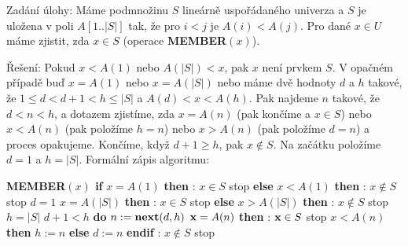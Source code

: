 \documentclass[a4paper,12pt]{article}
\begin{document}
Zadání úlohy: Máme podmnožinu $S$ lineárně 
uspořádaného univerza a $S$ je uložena v poli 
$A[1..|S|]$ tak, že pro $i<j$ je $A(i)<A(j)$. Pro dané $x\in 
U$ 
máme zjistit, zda $x\in S$ (operace {\bf MEMBER$(x)$}).

Řešení:  Pokud $x<A(1)$ nebo $A(|S|)<x$, pak $
x$ 
není prvkem $S$.  V opačném případě buď $x=
A(1)$ nebo 
$x=A(|S|)$ nebo máme dvě hodnoty $d$ 
a $h$ takové, že $1\le d<d+1<h\le |S|$ a $A(d)<x<A(h)$.  Pak 
najdeme $n$ takové, že $d<n<h$, a dotazem 
zjistíme, zda $x=A(n)$ (pak končíme a $x\in S$) nebo 
$x<A(n)$ (pak položíme $h=n$) nebo $x>A(n)$ (pak 
položíme $d=n$) a proces opakujeme.  Končíme, když 
$d+1\ge h$, pak $x\notin S$. Na začátku položíme $d=1$ a $
h=|S|$.
Formální zápis algoritmu:

{\bf MEMBER$(x)$\newline 
if} $x=A(1)$ {\bf then}\newline 
\phantom{---}{\bf Výstup}: $x\in S$ stop\newline 
{\bf else}\newline 
\phantom{---}{\bf if} $x<A(1)$ {\bf then}\newline 
\phantom{------}{\bf Výstup}: $x\notin S$ stop\newline 
\phantom{---}{\bf else}\newline 
\phantom{------}$d=1$\newline 
\phantom{---}{\bf endif\newline
\bf endif\newline 
if} $x=A(|S|)$ {\bf then}\newline 
\phantom{---}{\bf Výstup}: $x\in S$ stop\newline 
{\bf else}\newline 
\phantom{---}{\bf if} $x>A(|S|)$ {\bf then}\newline 
\phantom{------}{\bf Výstup}: $x\notin S$ stop\newline 
\phantom{---}{\bf else}\newline 
\phantom{------}$h=|S|$\newline 
\phantom{---}{\bf endif\newline
endif\newline 
while} $d+1<h$ {\bf do}\newline 
\phantom{---}$n:=\text{{\bf next}}(d,h)$\newline 
\phantom{---}{\bf if} $\bold x=A(n)$ {\bf then}\newline 
\phantom{------}{\bf Výstup}: $\bold x\in S$ stop\newline 
\phantom{---}{\bf else}\newline 
\phantom{------}{\bf if} $x<A(n)$ {\bf then} $h:=n$ {\bf else} $d:=n$ {\bf endif}\newline 
\phantom{---}{\bf endif\newline 
enddo\newline 
Výstup}: $x\notin S$ stop
\end{document}
